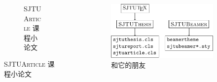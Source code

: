 \begin{frame}
\begin{columns}
\begin{column}{.45\textwidth}
\begin{figure}
\begin{subfigure}{\textwidth}
          \caption{\textsc{SJTUArticle} 课程小论文}
        \end{subfigure}
      \end{figure}
    \end{column}
    \begin{column}{.5\textwidth}
      \begin{figure}
        \includegraphics{support/figures/sjtutex.pdf}
        \caption{\SJTUTeX{} 和它的朋友}
      \end{figure}
    \end{column}
  \end{columns}

\end{frame}
